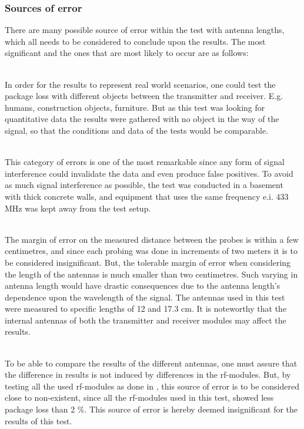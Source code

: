 \subsubsection*{Sources of error}
There are many possible source of error within the test with antenna lengths, which all needs to be considered to conclude upon the results.
The most significant and the ones that are most likely to occur are as follows:
\begin{description}[labelindent=\parindent]
    \item[Objects placed in the way of the signal] \hfill \\
    In order for the results to represent real world scenarios, one could test the package loss with different objects between the transmitter and receiver. 
    E.g. humans, construction objects, furniture.
    But as this test was looking for quantitative data the results were gathered with no object in the way of the signal, so that the conditions and data of the tests would be comparable.
    \item[Signal interference] \hfill \\
    This category of errors is one of the most remarkable since any form of signal interference could invalidate the data and even produce false positives.
    To avoid as much signal interference as possible, the test was conducted in a basement with thick concrete walls, and equipment that uses the same frequency e.i. 433 MHz was kept away from the test setup.
    \item[Inaccuracy in distance and antenna length] \hfill \\
    The margin of error on the measured distance between the probes is within a few centimetres, and since each probing was done in increments of two meters it is to be considered insignificant.
    But, the tolerable margin of error when considering the length of the antennas is much smaller than two centimetres.
    Such varying in antenna length would have drastic consequences due to the antenna length's dependence upon the wavelength of the signal.
    The antennas used in this test were measured to specific lengths of 12 and 17.3 cm.
    It is noteworthy that the internal antennas of both the transmitter and receiver modules may affect the results.
    \item[Difference in \acrshort{rf}-modules] \hfill \\
    To be able to compare the results of the different antennas, one must assure that the difference in results is not induced by differences in the \gls{rf}-modules.
    But, by testing all the used \gls{rf}-modules as done in , this source of error is to be considered close to non-existent, since all the \gls{rf}-modules used in this test, showed less package loss than 2 \%.
    This source of error is hereby deemed insignificant for the results of this test.
\end{description}

